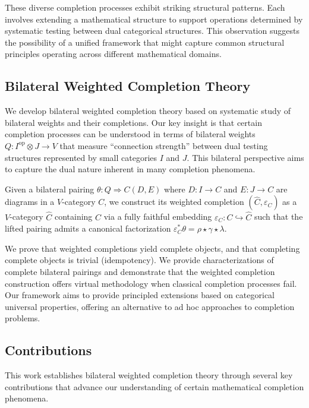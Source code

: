 \documentclass[11pt]{article}
\theoremstyle{plain}
\theoremstyle{definition}
\theoremstyle{remark}
\begin{document}
These diverse completion processes exhibit striking structural patterns. Each involves extending a mathematical structure to support operations determined by systematic testing between dual categorical structures. This observation suggests the possibility of a unified framework that might capture common structural principles operating across different mathematical domains.

\subsection{Bilateral Weighted Completion Theory}

We develop bilateral weighted completion theory based on systematic study of bilateral weights and their completions. Our key insight is that certain completion processes can be understood in terms of bilateral weights $Q : I^{\mathrm{op}} \otimes J \to V$ that measure ``connection strength'' between dual testing structures represented by small categories $I$ and $J$. This bilateral perspective aims to capture the dual nature inherent in many completion phenomena.

Given a bilateral pairing $\theta : Q \Rightarrow C(D, E)$ where $D : I \to C$ and $E : J \to C$ are diagrams in a $V$-category $C$, we construct its weighted completion $(\widehat{C}, \varepsilon_C)$ as a $V$-category $\widehat{C}$ containing $C$ via a fully faithful embedding $\varepsilon_C : C \hookrightarrow \widehat{C}$ such that the lifted pairing admits a canonical factorization $\varepsilon_C^* \theta = \rho \star \gamma \star \lambda$.

We prove that weighted completions yield complete objects, and that completing complete objects is trivial (idempotency). We provide characterizations of complete bilateral pairings and demonstrate that the weighted completion construction offers virtual methodology when classical completion processes fail. Our framework aims to provide principled extensions based on categorical universal properties, offering an alternative to ad hoc approaches to completion problems.

\subsection{Contributions}
This work establishes bilateral weighted completion theory through several key contributions that advance our understanding of certain mathematical completion phenomena.
\end{document}
